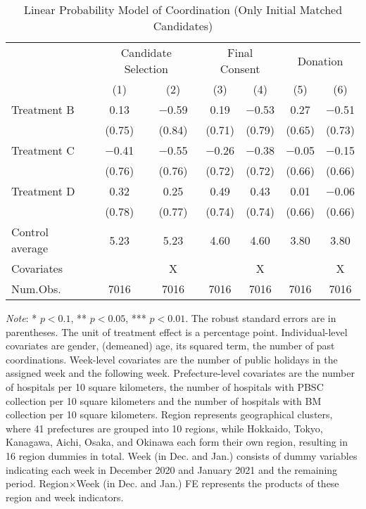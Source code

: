 \documentclass[12pt, a4paper]{article}
\begin{document}
\begin{table}[H]

\caption{\label{tab:lm-coordinate-initial-matched}Linear Probability Model of Coordination (Only Initial Matched Candidates)}
\centering
\fontsize{8}{10}\selectfont
\begin{threeparttable}
\begin{tabular}[t]{lcccccc}
\toprule
\multicolumn{1}{c}{ } & \multicolumn{2}{c}{Candidate Selection} & \multicolumn{2}{c}{Final Consent} & \multicolumn{2}{c}{Donation} \\
\cmidrule(l{3pt}r{3pt}){2-3} \cmidrule(l{3pt}r{3pt}){4-5} \cmidrule(l{3pt}r{3pt}){6-7}
  & (1) & (2) & (3) & (4) & (5) & (6)\\
\midrule
Treatment B & \num{0.13} & \num{-0.59} & \num{0.19} & \num{-0.53} & \num{0.27} & \num{-0.51}\\
 & (\num{0.75}) & (\num{0.84}) & (\num{0.71}) & (\num{0.79}) & (\num{0.65}) & (\num{0.73})\\
Treatment C & \num{-0.41} & \num{-0.55} & \num{-0.26} & \num{-0.38} & \num{-0.05} & \num{-0.15}\\
 & (\num{0.76}) & (\num{0.76}) & (\num{0.72}) & (\num{0.72}) & (\num{0.66}) & (\num{0.66})\\
Treatment D & \num{0.32} & \num{0.25} & \num{0.49} & \num{0.43} & \num{0.01} & \num{-0.06}\\
 & (\num{0.78}) & (\num{0.77}) & (\num{0.74}) & (\num{0.74}) & (\num{0.66}) & (\num{0.66})\\
\midrule
Control average & 5.23 & 5.23 & 4.60 & 4.60 & 3.80 & 3.80\\
Covariates &  & X &  & X &  & X\\
Num.Obs. & \num{7016} & \num{7016} & \num{7016} & \num{7016} & \num{7016} & \num{7016}\\
\bottomrule
\end{tabular}
\begin{tablenotes}
\item \emph{Note}: * $p < 0.1$, ** $p < 0.05$, *** $p < 0.01$. The robust standard errors are in parentheses. The unit of treatment effect is a percentage point. Individual-level covariates are gender, (demeaned) age, its squared term, the number of past coordinations. Week-level covariates are the number of public holidays in the assigned week and the following week. Prefecture-level covariates are the number of hospitals per 10 square kilometers, the number of hospitals with PBSC collection per 10 square kilometers and the number of hospitals with BM collection per 10 square kilometers. Region represents geographical clusters, where 41 prefectures are grouped into 10 regions, while Hokkaido, Tokyo, Kanagawa, Aichi, Osaka, and Okinawa each form their own region, resulting in 16 region dummies in total. Week (in Dec. and Jan.) consists of dummy variables indicating each week in December 2020 and January 2021 and the remaining period. Region$\times$Week (in Dec. and Jan.) FE represents the products of these region and week indicators.
\end{tablenotes}
\end{threeparttable}
\end{table}
\end{document}
